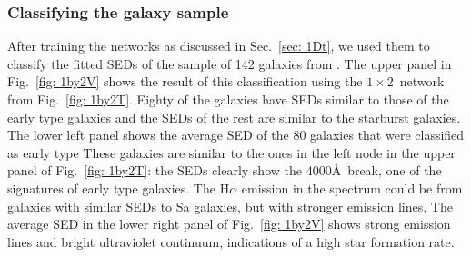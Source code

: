         \subsubsection{Classifying the galaxy sample}
         \label{sec: 1Dv}
            After training the networks as discussed in Sec.~\ref{sec: 1Dt}, we used them to classify the fitted SEDs of the sample of 142 galaxies from .
            The upper panel in Fig.~\ref{fig: 1by2V} shows the result of this classification using the $1\times2$~network from Fig.~\ref{fig: 1by2T}.
            Eighty of the galaxies have SEDs similar to those of the early type galaxies and the SEDs of the rest are similar to the starburst galaxies.
            The lower left panel shows the average SED of the 80 galaxies that were classified as early type 
            These galaxies are similar to the ones in the left node in the upper panel of Fig.~\ref{fig: 1by2T}:
            the SEDs clearly show the 4000\AA~break, one of the signatures of early type galaxies.
            The H$\alpha$ emission in the spectrum could be from galaxies with similar SEDs to Sa galaxies, but with stronger emission lines.
            The average SED in the lower right panel of Fig.~\ref{fig: 1by2V} shows strong emission lines and bright ultraviolet continuum, indications of a high star formation rate.
